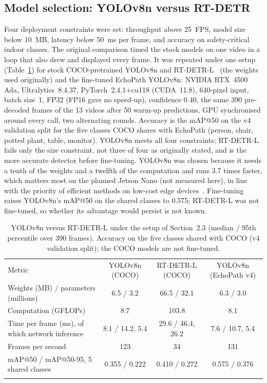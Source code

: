 \documentclass[3p,times,procedia]{elsarticle}
\DeclareRobustCommand{\rev}[1]{{\hlattr=1 #1}}
\DeclareRobustCommand{\rev}[1]{\hl{#1}}
\DeclareRobustCommand{\rev}[1]{#1}
\begin{document}
\subsection{Model selection: YOLOv8n versus RT-DETR}

Four deployment constraints were set: throughput above 25~FPS, model size
below 10~MB, latency below 50~ms per frame, and accuracy on safety-critical
indoor classes.
\rev{The original comparison timed the stock models on one video in a loop that
also drew and displayed every frame.} It was repeated under one setup
(Table~\ref{tab:model_compare}) for stock COCO-pretrained YOLOv8n and
RT-DETR-L~\cite{zhao2023rtdetr} (the weights used originally) and the
fine-tuned EchoPath YOLOv8n: \rev{NVIDIA RTX~4500 Ada, Ultralytics~8.4.37,
PyTorch~2.4.1+cu118 (CUDA~11.8), 640-pixel input, batch size~1, FP32} (FP16
gave no speed-up), confidence 0.40, the same 390 pre-decoded frames of the
13 videos after 50 warm-up predictions, GPU synchronised around every call,
two alternating rounds. \rev{Accuracy is the mAP@50 on the v4 validation split
for the five classes COCO shares with EchoPath} (person, chair, potted plant,
table, monitor). YOLOv8n meets all four constraints; \rev{RT-DETR-L fails only
the size constraint, not three of four as originally stated}, and is the more
accurate detector before fine-tuning. YOLOv8n was chosen because it needs a
tenth of the weights and a twelfth of the computation and runs 3.7 times
faster, which matters most on the planned Jetson Nano (not measured here),
in line with the priority of efficient methods on low-cost edge
devices~\cite{messaoudi2022}. Fine-tuning raises YOLOv8n's mAP@50 on the
shared classes to 0.575; \rev{RT-DETR-L was not fine-tuned, so whether its
advantage would persist is not known.}

\begin{table}[!t]
\caption{\rev{YOLOv8n versus RT-DETR-L under the setup of Section~2.3} (median /
95th percentile over 390 frames). Accuracy on the five classes shared with
COCO (v4 validation split); the COCO models are not fine-tuned.}
\label{tab:model_compare}
\footnotesize
\begin{tabular*}{\hsize}{@{\extracolsep{\fill}}lccc@{}}
\toprule
Metric & YOLOv8n (COCO) & RT-DETR-L (COCO) & YOLOv8n (EchoPath v4) \\
\colrule
Weights (MB) / parameters (millions) & \rev{6.5 / 3.2} & \rev{66.5 / 32.1} & \rev{6.3 / 3.0} \\
Computation (GFLOPs)                 & \rev{8.7}        & \rev{103.8}       & \rev{8.1} \\
Time per frame (ms), of which network inference & \rev{8.1 / 14.2, 5.4} & \rev{29.6 / 46.4, 26.2} & \rev{7.6 / 10.7, 5.4} \\
Frames per second                    & \rev{123}        & \rev{34}          & \rev{131} \\
mAP@50 / mAP@50-95, 5 shared classes & \rev{0.355 / 0.222} & \rev{0.410 / 0.272} & \rev{0.575 / 0.376} \\
\botrule
\end{tabular*}
\end{table}
\end{document}
